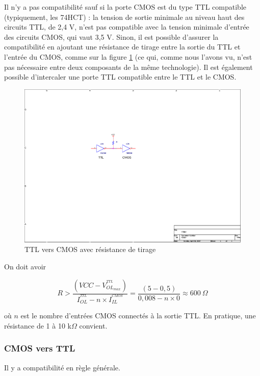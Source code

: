 \documentclass[a4paper]{article}
\begin{document}
Il n'y a pas compatibilité sauf si la porte \ac{CMOS} est du type \ac{TTL} compatible (typiquement, les 74HCT) : la tension de sortie minimale au niveau haut des circuits \ac{TTL}, de 2,4 V, n'est pas compatible avec la tension minimale d'entrée des circuits \ac{CMOS}, qui vaut 3,5 V. Sinon, il est possible d'assurer la compatibilité en ajoutant une résistance de tirage entre la sortie du \ac{TTL} et l'entrée du \ac{CMOS}, comme sur la figure \ref{TTL_vers_CMOS} (ce qui, comme nous l'avons vu, n'est pas nécessaire entre deux composants de la même technologie). Il est également possible d'intercaler une porte \ac{TTL} compatible entre le \ac{TTL} et le \ac{CMOS}.

\begin{figure}[H]
	\centering
	\includegraphics[scale=1.00]{Images/TTL_vers_CMOS}
	\caption{TTL vers CMOS avec résistance de tirage
		\label{TTL_vers_CMOS}}
\end{figure}

On doit avoir

\[R > \frac{(VCC - V_{OL_{max}}^{^{TTL}})}{I_{OL}^{^{TTL}} - n \times I_{IL}^{^{CMOS}}} = \frac{(5 - 0,5)}{0,008 - n \times 0} \approx 600\ \Omega\]

où $n$ est le nombre d'entrées \ac{CMOS} connectés à la sortie \ac{TTL}. En pratique, une résistance de 1 à 10 k$\Omega$ convient.

\subsubsection{CMOS vers TTL}

Il y a compatibilité en règle générale.
\end{document}
